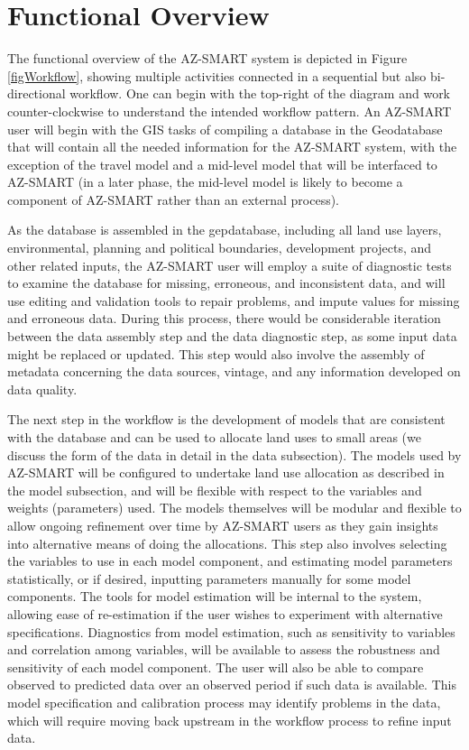 \section{Functional Overview}
The functional overview of the AZ-SMART system is depicted in Figure \ref{figWorkflow}, showing multiple activities connected in a sequential but also bi-directional workflow.  One can begin with the top-right of the diagram and work counter-clockwise to understand the intended workflow pattern.  An AZ-SMART user will begin with the GIS tasks of compiling a database in the Geodatabase that will contain all the needed information for the AZ-SMART system, with the exception of the travel model and a mid-level model that will be interfaced to AZ-SMART (in a later phase, the mid-level model is likely to become a component of AZ-SMART rather than an external process). 

As the database is assembled in the gepdatabase, including all land use layers, environmental, planning and political boundaries, development projects, and other related inputs, the AZ-SMART user will employ a suite of diagnostic tests to examine the database for missing, erroneous, and inconsistent data, and will use editing and validation tools to repair problems, and impute values for missing and erroneous data.  During this process, there would be considerable iteration between the data assembly step and the data diagnostic step, as some input data might be replaced or updated.  This step would also involve the assembly of metadata concerning the data sources, vintage, and any information developed on data quality.

The next step in the workflow is the development of models that are consistent with the database and can be used to allocate land uses to small areas (we discuss the form of the data in detail in the data subsection).  The models used by AZ-SMART will be configured to undertake land use allocation as described in the model subsection, and will be flexible with respect to the variables and weights (parameters) used.  The models themselves will be modular and flexible to allow ongoing refinement over time by AZ-SMART users as they gain insights into alternative means of doing the allocations.  This step also involves selecting the variables to use in each model component, and estimating model parameters statistically, or if desired, inputting parameters manually for some model components.  The tools for model estimation will be internal to the system, allowing ease of re-estimation if the user wishes to experiment with alternative specifications.  Diagnostics from model estimation, such as sensitivity to variables and correlation among variables, will be available to assess the robustness and sensitivity of each model component.  The user will also be able to compare observed to predicted data over an observed period if such data is available.  This model specification and calibration process may identify problems in the data, which will require moving back upstream in the workflow process to refine input data.

